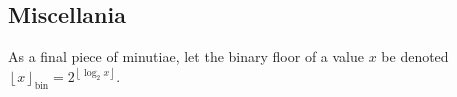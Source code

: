 \subsection{Miscellania}

As a final piece of minutiae, let the binary floor of a value $x$ be denoted $\left\lfloor x \right\rfloor_\mathrm{bin} = 2^{\left\lfloor \log_2 x \right\rfloor}$.
